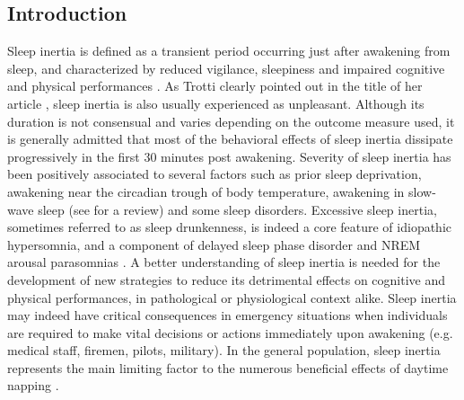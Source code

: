 \subsection*{Introduction}
\label{res:inertia:inertia:intro}

Sleep inertia is defined as a transient period occurring just after awakening from sleep, and characterized by reduced vigilance, sleepiness and impaired cognitive and physical performances \citep{tassi_sleep_2000, trotti_waking_2016}. As Trotti clearly pointed out in the title of her article , sleep inertia is also usually experienced as unpleasant. Although its duration is not consensual and varies depending on the outcome measure used, it is generally admitted that most of the behavioral effects of sleep inertia dissipate progressively in the first 30 minutes post awakening. Severity of sleep inertia has been positively associated to several factors such as prior sleep deprivation, awakening near the circadian trough of body temperature, awakening in slow-wave sleep (see \citet{tassi_sleep_2000} for a review) and some sleep disorders. Excessive sleep inertia, sometimes referred to as sleep drunkenness, is indeed a core feature of idiopathic hypersomnia, and a component of delayed sleep phase disorder and NREM arousal parasomnias \citep{trotti_waking_2016}. A better understanding of sleep inertia is needed for the development of new strategies to reduce its detrimental effects on cognitive and physical performances, in pathological or physiological context alike. Sleep inertia may indeed have critical consequences in emergency situations when individuals are required to make vital decisions or actions immediately upon awakening (e.g. medical staff, firemen, pilots, military). In the general population, sleep inertia represents the main limiting factor to the numerous beneficial effects of daytime napping \citep{faraut_napping:_2016}.

